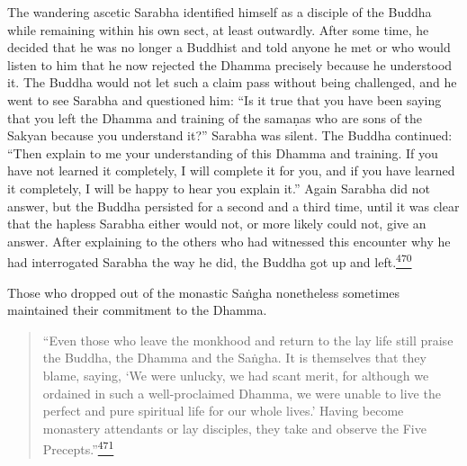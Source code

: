 The wandering ascetic Sarabha identified himself as a disciple of the
Buddha while remaining within his own sect, at least outwardly. After
some time, he decided that he was no longer a Buddhist and told anyone
he met or who would listen to him that he now rejected the Dhamma
precisely because he understood it. The Buddha would not let such a
claim pass without being challenged, and he went to see Sarabha and
questioned him: ``Is it true that you have been saying that you left the
Dhamma and training of the samaṇas who are sons of the Sakyan because
you understand it?'' Sarabha was silent. The Buddha continued: ``Then
explain to me your understanding of this Dhamma and training. If you
have not learned it completely, I will complete it for you, and if you
have learned it completely, I will be happy to hear you explain it.''
Again Sarabha did not answer, but the Buddha persisted for a second and
a third time, until it was clear that the hapless Sarabha either would
not, or more likely could not, give an answer. After explaining to the
others who had witnessed this encounter why he had interrogated Sarabha
the way he did, the Buddha got up and
left.\label{footprints_split_013.html_fnref470}\hyperref[footprints_split_025.htmlux5cux23fn470]{\textsuperscript{470}}

Those who dropped out of the monastic Saṅgha nonetheless sometimes
maintained their commitment to the Dhamma.

\begin{quote}
``Even those who leave the monkhood and return to the lay life still
praise the Buddha, the Dhamma and the Saṅgha. It is themselves that they
blame, saying, `We were unlucky, we had scant merit, for although we
ordained in such a well-proclaimed Dhamma, we were unable to live the
perfect and pure spiritual life for our whole lives.' Having become
monastery attendants or lay disciples, they take and observe the Five
Precepts.''\label{footprints_split_013.html_fnref471}\hyperref[footprints_split_025.htmlux5cux23fn471]{\textsuperscript{471}}
\end{quote}

